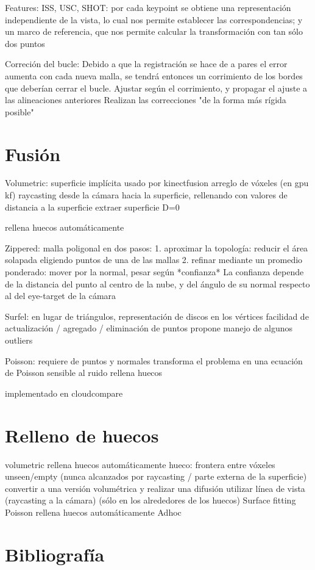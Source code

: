 \documentclass{pfc}
\begin{document}
		Features:
			ISS, USC, SHOT:
				por cada keypoint se obtiene 
				una representación independiente de la vista,
					lo cual nos permite establecer las correspondencias;
				y un marco de referencia, que nos permite calcular la transformación con tan sólo dos puntos

		Correción del bucle:
			Debido a que la registración se hace de a pares el error aumenta
			con cada nueva malla, se tendrá entonces un corrimiento de los
			bordes que deberían cerrar el bucle.
				Ajustar según el corrimiento, y propagar el ajuste a las alineaciones anteriores
				Realizan las correcciones "de la forma más rígida posible"

	\section{Fusión}
		Volumetric: superficie implícita %
			usado por kinectfusion
			arreglo de vóxeles (en gpu kf)
			raycasting desde la cámara hacia la superficie,
				rellenando con valores de distancia a la superficie
			extraer superficie D=0

			rellena huecos automáticamente

		Zippered: %
			malla poligonal
			en dos pasos:
				1. aproximar la topología: reducir el área solapada eligiendo puntos de una de las mallas
				2. refinar mediante un promedio ponderado: mover por la normal, pesar según *confianza*
			La confianza depende de la distancia del punto al centro de la nube, y del ángulo de su normal respecto al del eye-target de la cámara

		Surfel: %
			en lugar de triángulos, representación de discos en los vértices
			facilidad de actualización / agregado / eliminación de puntos
			propone manejo de algunos outliers

		Poisson: %
			requiere de puntos y normales
			transforma el problema en una ecuación de Poisson %
			sensible al ruido
			rellena huecos

			implementado en cloudcompare


	\section{Relleno de huecos}
		volumetric rellena huecos automáticamente
			hueco: frontera entre vóxeles unseen/empty (nunca alcanzados por raycasting / parte externa de la superficie)
			convertir a una versión volumétrica y realizar una difusión
				utilizar línea de vista (raycasting a la cámara)
				(sólo en los alrededores de los huecos)
		Surface fitting
		Poisson rellena huecos automáticamente
		Adhoc

\section{Bibliografía}
\end{document}
